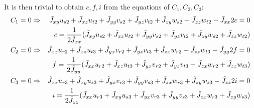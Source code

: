 It is then trivial to obtain $c,f,i$ from the equations of $C_1,C_2,C_3$:
\begin{eqnarray}
C_1=0 &\Rightarrow&
\tilde{J}_{xy} u_{s2} + \tilde{J}_{xz} u_{t2} + 
\tilde{J}_{yy} v_{s2} + \tilde{J}_{yz} v_{t2} + 
\tilde{J}_{zy} w_{s2} + \tilde{J}_{zz} w_{t2} -\tilde{J}_{xx} 2c =0 \nonumber\\
&& c= \frac{1}{2 \tilde{J}_{xx}} (
\tilde{J}_{xy} u_{s2} + \tilde{J}_{xz} u_{t2} + 
\tilde{J}_{yy} v_{s2} + \tilde{J}_{yz} v_{t2} + 
\tilde{J}_{zy} w_{s2} + \tilde{J}_{zz} w_{t2} ) \nonumber\\
C_2=0 &\Rightarrow&
\tilde{J}_{xx} u_{r2} + \tilde{J}_{xz} u_{t3} +
\tilde{J}_{yx} v_{r2} + \tilde{J}_{yz} v_{t3} +
\tilde{J}_{zx} w_{r2} + \tilde{J}_{zz} w_{t3} -\tilde{J}_{yy} 2f =0 \nonumber\\
&& f= \frac{1}{2 \tilde{J}_{yy}} (  
\tilde{J}_{xx} u_{r2} + \tilde{J}_{xz} u_{t3} +
\tilde{J}_{yx} v_{r2} + \tilde{J}_{yz} v_{t3} +
\tilde{J}_{zx} w_{r2} + \tilde{J}_{zz} w_{t3} ) \nonumber\\
C_3=0 &\Rightarrow&
\tilde{J}_{xx} u_{r3} + \tilde{J}_{xy} u_{s3} +
\tilde{J}_{yx} v_{r3} + \tilde{J}_{yy} v_{s3} +
\tilde{J}_{zx} w_{r3} + \tilde{J}_{zy} w_{s3} -\tilde{J}_{zz} 2i =0 \nonumber\\
&& i= \frac{1}{2 \tilde{J}_{zz}} (  
\tilde{J}_{xx} u_{r3} + \tilde{J}_{xy} u_{s3} +
\tilde{J}_{yx} v_{r3} + \tilde{J}_{yy} v_{s3} +
\tilde{J}_{zx} w_{r3} + \tilde{J}_{zy} w_{s3} ) \nonumber
\end{eqnarray}

